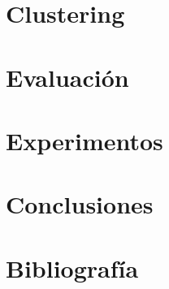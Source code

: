 \documentclass[10pt,a4paper,draft]{article}
\begin{document}
\section{Clustering}
\section{Evaluación}
\section{Experimentos}
\section{Conclusiones}
\section{Bibliografía}
\end{document}
